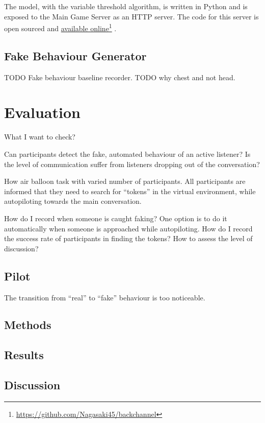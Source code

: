 \documentclass[]{simple-thesis}
\newcommand\fnurl[2]{%
  \href{#2}{#1}\footnote{\url{#2}}%
}
\begin{document}
The model, with the variable threshold algorithm, is written in Python and is exposed to the Main Game Server as an HTTP server.
The code for this server is open sourced and \fnurl{available online}{https://github.com/Nagasaki45/backchannel}.

\section{Fake Behaviour Generator}\label{system:fake_behaviour_generator}

TODO Fake behaviour baseline recorder.
TODO why chest and not head.


\chapter{Evaluation}

What I want to check?

Can participants detect the fake, automated behaviour of an active listener?
Is the level of communication suffer from listeners dropping out of the conversation?

How air balloon task with varied number of participants.
All participants are informed that they need to search for ``tokens'' in the virtual environment, while autopiloting towards the main conversation.

How do I record when someone is caught faking? One option is to do it automatically when someone is approached while autopiloting.
How do I record the success rate of participants in finding the tokens?
How to assess the level of discussion?

\section{Pilot}

The transition from ``real'' to ``fake'' behaviour is too noticeable.

\section{Methods}

\section{Results}

\section{Discussion}
\end{document}
